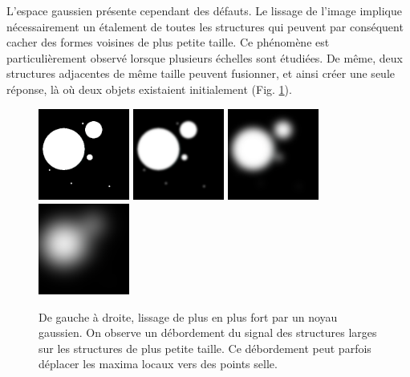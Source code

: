 L'espace gaussien présente cependant des défauts. Le lissage de l'image implique nécessairement un étalement de toutes les structures qui peuvent par conséquent cacher des formes voisines de plus petite taille. Ce phénomène est particulièrement observé lorsque plusieurs échelles sont étudiées. De même, deux structures adjacentes de même taille peuvent fusionner, et ainsi créer une seule réponse, là où deux objets existaient initialement (Fig. \ref{fig:scale_space_spilling}).
\begin{figure}[!ht]
  \centering
  \includegraphics[height=3cm]{Images/gaussian_spilling_init.png}
  \includegraphics[height=3cm]{Images/gaussian_spilling_g10.png}
  \includegraphics[height=3cm]{Images/gaussian_spilling_g40.png}
  \includegraphics[height=3cm]{Images/gaussian_spilling_g100.png}
  \caption{De gauche à droite, lissage de plus en plus fort par un noyau gaussien. On observe un débordement du signal des structures larges sur les structures de plus petite taille. Ce débordement peut parfois déplacer les maxima locaux vers des points selle.}
  \label{fig:scale_space_spilling}
\end{figure}
